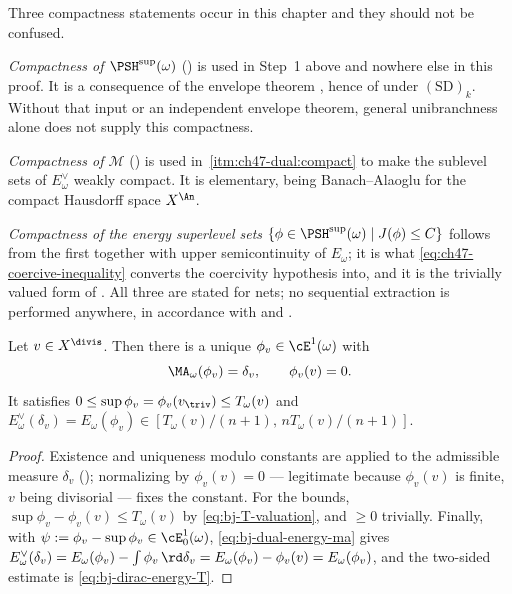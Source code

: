 \begin{remark}
\label{rem:ch47-compactness-attributed}
Three compactness statements occur in this chapter and they should not be
confused.

\emph{Compactness of $\PSH^{\sup}(\omega)$}
() is used in Step~1 above and nowhere else in
this proof.  It is a consequence of the envelope theorem
, hence of
under $\mathrm{(SD)}_k$. Without that input or an independent envelope
theorem, general unibranchness alone does not supply this compactness.

\emph{Compactness of $\mathcal M$} ()
is used in
\,\cref{itm:ch47-dual:compact} to make the
sublevel sets of $E^\vee_\omega$ weakly compact.  It is elementary, being
Banach--Alaoglu for the compact Hausdorff space $X^{\An}$.

\emph{Compactness of the energy superlevel sets}
$\{\phi\in\PSH^{\sup}(\omega)\mid J(\phi)\le C\}$ follows from the first
together with upper semicontinuity of $E_\omega$; it is what
\eqref{eq:ch47-coercive-inequality} converts the coercivity hypothesis
into, and it is the trivially valued form of
.  All three are stated for nets; no
sequential extraction is performed anywhere, in accordance with
 and .
\end{remark}

\begin{corollary}
\label{cor:ch47-divisorial-green}
Let $v\in X^{\divis}$.  Then there is a unique
$\phi_v\in\cE^1(\omega)$ with
\[
 \MA_\omega(\phi_v)=\delta_v,\qquad \phi_v(v)=0 .
\]
It satisfies $0\le\sup\phi_v=\phi_v(v_{\triv})\le T_\omega(v)$ and
$E^\vee_\omega(\delta_v)=E_\omega(\phi_v)\in
[T_\omega(v)/(n+1),\,nT_\omega(v)/(n+1)]$.
\end{corollary}

\begin{proof}
Existence and uniqueness modulo constants are
 applied to the admissible measure
$\delta_v$ (); normalizing by
$\phi_v(v)=0$ --- legitimate because $\phi_v(v)$ is finite, $v$ being
divisorial --- fixes the constant.  For the bounds,
$\sup\phi_v-\phi_v(v)\le T_\omega(v)$ by
\eqref{eq:bj-T-valuation}, and $\ge0$ trivially.  Finally, with
$\psi:=\phi_v-\sup\phi_v\in\cE^1_0(\omega)$,
\eqref{eq:bj-dual-energy-ma} gives
$E^\vee_\omega(\delta_v)=E_\omega(\phi_v)-\int\phi_v\,\rd\delta_v
=E_\omega(\phi_v)-\phi_v(v)=E_\omega(\phi_v)$, and the two-sided estimate
is \eqref{eq:bj-dirac-energy-T}.
\end{proof}

